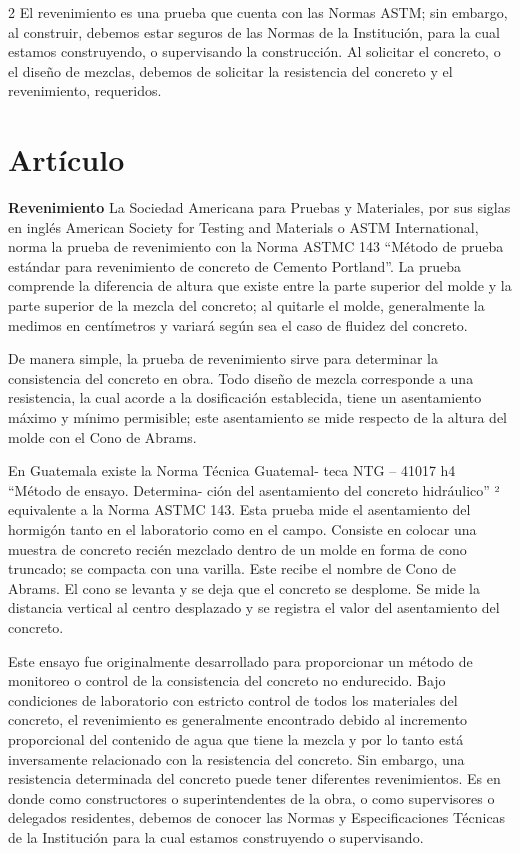\documentclass[12pt,spanish,Letterpaper,openany]{book}
\begin{document}
\begin {multicols}{2}
El revenimiento es una prueba que cuenta con las Normas ASTM; sin embargo, al construir, debemos estar seguros de las Normas de la Institución, para la cual estamos construyendo, o supervisando la construcción. Al solicitar el concreto, o el diseño de mezclas, debemos de solicitar la resistencia del concreto y el revenimiento, requeridos.

\hypertarget{artuxedculo-11}{%
\section{Artículo}\label{artuxedculo-11}}

\textbf{Revenimiento}
La Sociedad Americana para Pruebas y Materiales, por sus siglas en inglés American Society for Testing and Materials o ASTM International, norma la prueba de revenimiento con la Norma ASTMC 143 ``Método de prueba estándar para revenimiento de concreto de Cemento Portland''. La prueba comprende la diferencia de altura que existe entre la parte superior del molde y la parte superior de la mezcla del concreto; al quitarle el molde, generalmente la medimos en centímetros y variará según sea el caso de fluidez del concreto.

De manera simple, la prueba de revenimiento sirve para determinar la consistencia del concreto en obra. Todo diseño de mezcla corresponde a una resistencia, la cual acorde a la dosificación establecida, tiene un asentamiento máximo y mínimo permisible; este asentamiento se mide respecto de la altura del molde con el Cono de Abrams.

En Guatemala existe la Norma Técnica Guatemal-
teca NTG -- 41017 h4 ``Método de ensayo. Determina-
ción del asentamiento del concreto hidráulico'' ² equivalente a la Norma ASTMC 143. Esta prueba mide el asentamiento del hormigón tanto en el laboratorio como en el campo. Consiste en colocar una muestra de concreto recién mezclado dentro de un molde en forma de cono truncado; se compacta con una varilla. Este recibe el nombre de Cono de Abrams. El cono se levanta y se deja que el concreto se desplome. Se mide la distancia vertical al centro desplazado y se registra el valor del asentamiento del concreto.

Este ensayo fue originalmente desarrollado para proporcionar un método de monitoreo o control de la consistencia del concreto no endurecido. Bajo condiciones de laboratorio con estricto control de todos los materiales del concreto, el revenimiento es generalmente encontrado debido al incremento proporcional del contenido de agua que tiene la mezcla y por lo tanto está inversamente relacionado con la resistencia del concreto. Sin embargo, una resistencia determinada del concreto puede tener diferentes revenimientos. Es en donde como constructores o superintendentes de la obra, o como supervisores o delegados residentes, debemos de conocer las Normas y Especificaciones Técnicas de la Institución para la cual estamos construyendo o supervisando.


\end{multicols}
\end{document}
